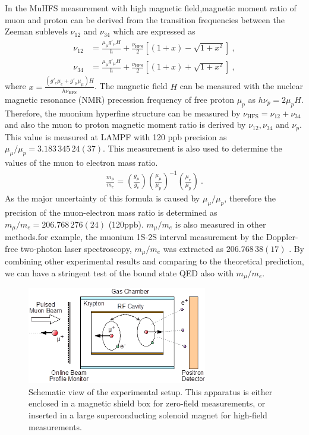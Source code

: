 In the MuHFS measurement with high magnetic field,magnetic
moment ratio of muon and proton can be derived from the
transition frequencies between the Zeeman sublevels $\nu_{12}$
and $\nu_{34}$ which are expressed as 
%
\begin{align}
\nu_{12}&= \frac{\mu_\mu g'_\mu H}{h}
           + \frac{\nu_{\text{HFS}}}{2}
             \left[ (1+x) - \sqrt{1+x^2} \right]~,\\
\nu_{34}&= \frac{\mu_\mu g'_\mu H}{h}
           + \frac{\nu_{\text{HFS}}}{2}
             \left[ (1+x) + \sqrt{1+x^2} \right]~,
\end{align}
%
where $x=\frac{(g'_e \mu_e + g'_\mu \mu_\mu)H}{h\nu_{\text{HFS}}}$.
The magnetic field $H$ can be measured with the nuclear magnetic
resonance (NMR) precession frequency of free proton $\mu_p$
as $h\nu_p = 2\mu_p H$.  Therefore, the muonium hyperfine
structure can be measured by $\nu_{\text{HFS}}=\nu_{12}+\nu_{34}$
and also the muon to proton magnetic moment ratio is derived
by $\nu_{12}, \nu_{34}$ and $\nu_p$.  This value is measured
at LAMPF with 120 ppb precision as $\mu_\mu/\mu_p =
3.183 \, 345  \, 24(37)$.  This measurement is also used to
determine the values of the muon to electron mass ratio.
%
\begin{align}
\frac{m_\mu}{m_e}
=
\left( \frac{g_\mu}{g_e} \right)
\left( \frac{\mu_\mu}{\mu_p} \right)^{-1}
\left( \frac{\mu_e}{\mu_p} \right) ~.
\end{align}
%
As the major uncertainty of this formula is caused by
$\mu_\mu/\mu_p$, therefore the precision of the muon-electron
mass ratio is determined as $m_\mu/m_e= 206.768 \, 276(24)$ (120ppb).
$m_\mu/m_e$ is also measured in other methods.for example, the
muonium 1S-2S interval measurement by the Doppler-free two-photon
laser spectroscopy, $m_\mu/m_e$ was extracted as $206.768 \, 38(17)$
\cite{Meyer-etal-PRL84.1136}.  By combining other experimental
results and comparing to the theoretical prediction, we can
have a stringent test of the bound state QED also with $m_\mu/m_e$.


\begin{figure}[th]
 \centering
 \includegraphics[width=0.7\textwidth, bb=0 0 230 124]
                 {./Fig/MuHFS-MuSEUM-setup.png}
\caption{\label{fig:MuSEUM-setup}
Schematic view of the experimental setup.  This apparatus is
either enclosed in a magnetic shield box for zero-field
measurements, or inserted in a large superconducting solenoid
magnet for high-field measurements.}
\end{figure}

